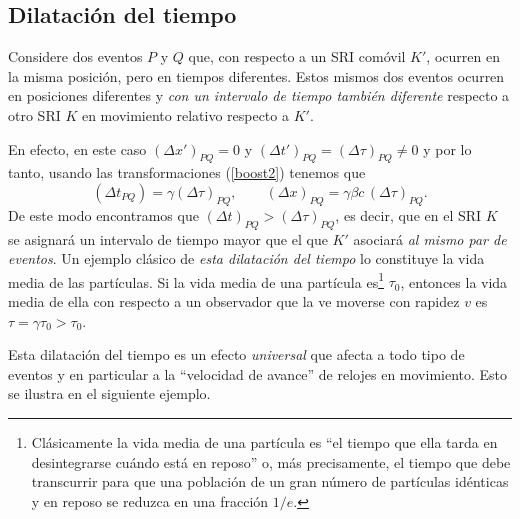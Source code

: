 \subsection{Dilatación del tiempo}
Considere dos eventos $P$ y $Q$ que, con respecto a un SRI comóvil $K'$, ocurren en la misma posición, pero en tiempos diferentes. Estos mismos dos eventos ocurren en posiciones diferentes y \textit{con un intervalo de tiempo también diferente} respecto a otro SRI $K$ en movimiento relativo respecto a $K'$. 

En efecto, en este caso $(\Delta x')_{PQ}=0$ y $(\Delta t')_{PQ}=(\Delta\tau)_{PQ}\neq 0$ y por lo tanto, usando las transformaciones (\ref{boost2}) tenemos que
\begin{equation}
(\Delta t_{PQ})=\gamma (\Delta\tau)_{PQ}, \qquad (\Delta x)_{PQ}=\gamma\beta c\,(\Delta\tau)_{PQ}.
\end{equation}
De este modo encontramos que $(\Delta t)_{PQ}>(\Delta\tau)_{PQ}$, es decir, que en el SRI $K$ se asignará un intervalo de tiempo mayor que el que $K'$ asociará \textit{al mismo par de eventos}. Un ejemplo clásico de \textit{esta dilatación del tiempo} lo constituye la vida media de las partículas. Si la vida media de una partícula es\footnote{Clásicamente la vida media de una partícula es ``el tiempo que ella tarda en desintegrarse cuándo está en reposo'' o, más precisamente, el tiempo que debe transcurrir para que una población de un gran número de partículas idénticas y en reposo se reduzca en una fracción $1/e$.} $\tau_0$, entonces la vida media de ella con respecto a un observador que la ve moverse con rapidez $v$ es $\tau=\gamma\tau_0 >\tau_0$.

Esta dilatación del tiempo es un efecto \textit{universal} que afecta a todo tipo de eventos y en particular a la ``velocidad de avance'' de relojes en movimiento. Esto se ilustra en el siguiente ejemplo.

